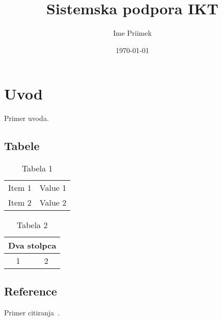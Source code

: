 \documentclass[a4paper,12pt]{article}
\title{Sistemska podpora IKT}
\date{\today}
\author{Ime Priimek}
\begin{document}
\maketitle
 
\newpage

\section{Uvod}  
Primer uvoda.

\subsection{Tabele}

\begin{table}[htb]
\centering
\begin{tabular}{|c|c|}
  \hline
  Item 1 & Value 1 \\
  Item 2 & Value 2 \\
  \hline
\end{tabular}
  \caption{Tabela 1}
\end{table}

\begin{table}[htb]
\centering
\begin{tabular}{|c|c|}
\hline
\multicolumn{2}{|c|}{Dva stolpca} \\
\hline
1 & 2 \\
\hline
\end{tabular}
\caption{Tabela 2}
\end{table}

\subsection{Reference}

Primer citiranja~\cite{karakativc2022strojno}.



\end{document}
